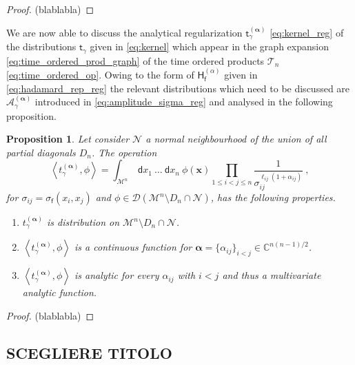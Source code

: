 \documentclass[12pt]{book}
\newcommand{\sm}[1]{\left\langle#1\right\rangle}
\let\int\int
\newcommand{\Acal}{\mathcal{A}}
\newcommand{\Dcal}{\mathcal{D}}
\newcommand{\Mcal}{\mathcal{M}}
\newcommand{\Ncal}{\mathcal{N}}
\newcommand{\Tcal}{\mathcal{T}}
\newcommand{\Cbb}{\mathbb{C}}
\newcommand{\Hsf}{\mathsf{H}}
\newcommand{\dsf}{\mathsf{d}}
\newcommand{\fsf}{\mathsf{f}}
\newcommand{\tsf}{\mathsf{t}}
\theoremstyle{break}
\newtheorem{proposition}{Proposition}
\begin{document}
\begin{proof}
(blablabla)
\end{proof}


We are now able to discuss the analytical regularization $\tsf^{(\boldsymbol{\alpha})}_\gamma$ \eqref{eq:kernel_reg} of the distributions $\tsf_\gamma$ given in \eqref{eq:kernel} which appear in the graph expansion \eqref{eq:time_ordered_prod_graph} of the time ordered products $\Tcal_n$ \eqref{eq:time_ordered_op}. Owing to the form of $\Hsf^{(\alpha)}_\fsf$ given in \eqref{eq:hadamard_rep_reg} the relevant distributions which need to be discussed are $\Acal^{(\boldsymbol{\alpha})}_\gamma$ introduced in \eqref{eq:amplitude_sigma_reg} and analysed in the following proposition.


\begin{proposition}\label{prop:amplitude_sigma_prop_analyt}
Let consider $\Ncal$ a normal neighbourhood of the union of all partial diagonals $D_n$. The operation
%
\begin{equation*}
\sm{ t_\gamma^{(\boldsymbol{\alpha})} , \phi } = \int_{\Mcal^n} \ \dsf x_1 \ \dots \ \dsf x_n \ \phi(\mathbf{x}) \prod_{ 1 \leq i < j \leq n } \frac{1}{\sigma_{ij}^{\ell_{ij}(1+ \alpha_{ij})}}  \ , 
\end{equation*}
%
for $\sigma_{ij}=\sigma_\fsf(x_i,x_j)$ and $\phi\in \Dcal(\Mcal^n\setminus D_n\cap \Ncal)$, has the following properties.
%
\begin{enumerate}
%
\item $t_\gamma^{(\boldsymbol{\alpha})}$ is distribution on $\Mcal^n\setminus D_n\cap \Ncal$.
%
\item $\sm{ t_\gamma^{(\boldsymbol{\alpha})} , \phi }$ is a continuous function for $\boldsymbol{\alpha} = \{\alpha_{ij}\}_{i<j} \in \Cbb^{n(n-1)/2}$.
%
\item $\sm{ t_\gamma^{(\boldsymbol{\alpha})} , \phi }$ is analytic for every $\alpha_{ij}$ with $i<j$ and thus a multivariate analytic function.
%
\end{enumerate}
%
\end{proposition}


\begin{proof}
(blablabla)
\end{proof}



\subsection{SCEGLIERE TITOLO} %
\end{document}
